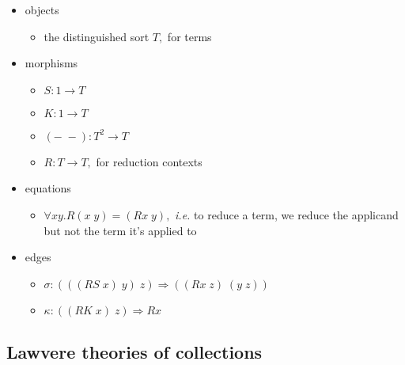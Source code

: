 \documentclass[a4paper,UKenglish]{article}
\newcommand{\maps}{\colon}
\begin{document}
\begin{itemize}
  \item objects
    \begin{itemize}
      \item the distinguished sort $T,$ for terms
    \end{itemize}
  \item morphisms
    \begin{itemize}
      \item $S\maps 1 \to T$
      \item $K\maps 1 \to T$
      \item $(-\; -)\maps T^2 \to T$
      \item $R\maps T \to T,$ for reduction contexts
    \end{itemize}
  \item equations
    \begin{itemize}
      \item $\forall xy.R(x\; y) = (Rx\; y),$ {\em i.e.} to reduce a term, we reduce the applicand but not the term it's applied to
    \end{itemize}
  \item edges
    \begin{itemize}
      \item $\sigma\maps (((RS\; x)\; y)\; z) \Rightarrow ((Rx\; z)\; (y\; z))$
      \item $\kappa\maps ((RK\; x)\; z) \Rightarrow Rx$
    \end{itemize}
\end{itemize}


\subsection{Lawvere theories of collections}
\end{document}
